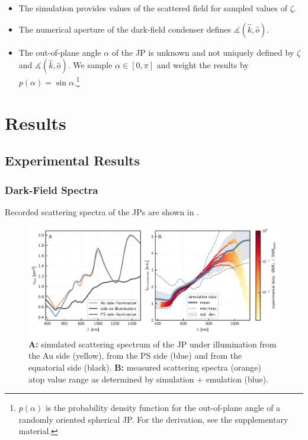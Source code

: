 \documentclass[10pt]{article}
\newcommand{\reffig}[2]{\mbox{\sffamily{Figure \ref{#1}#2}}}
\begin{document}
\begin{multicols}{2}
\begin{itemize}
    \item The simulation provides values of the scattered field for sampled values of $\zeta$.
    \item The numerical aperture of the dark-field condenser defines $\measuredangle(\hat{k},\hat{o})$.
    \item The out-of-plane angle $\alpha$ of the JP is unknown and not uniquely defined by $\zeta$ and $\measuredangle(\hat{k},\hat{o})$. We sample $\alpha\in\left[0,\pi\right]$ and weight the results by $p(\alpha) = \sin\alpha$.\footnote{$p(\alpha)$ is the probability density function for the out-of-plane angle of a randomly oriented spherical JP. For the derivation, see the supplementary material.}
\end{itemize}









\section*{Results}

\subsection*{Experimental Results}

\subsubsection*{Dark-Field Spectra}


Recorded scattering spectra of the JPs are shown in \reffig{fig:spectra}{B}.

\begin{figure}[t]
    \centering
    \includegraphics{[fig] spectra.PDF}
    \caption{{\sffamily\bfseries A:} simulated scattering spectrum of the JP under illumination from the Au side (yellow), from the PS side (blue) and from the equatorial side (black). {\sffamily\bfseries B:} measured scattering spectra (orange) atop value range as determined by simulation + emulation (blue).}
    \label{fig:spectra}
\end{figure}


\end{multicols}
\end{document}
